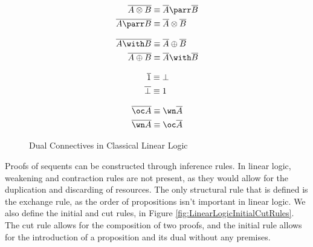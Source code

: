 \begin{figure}[H]
    \begin{minipage}{0.225\textwidth}
        \begin{align*}
            \dual{A \otimes B} & \equiv \dual{A} \parr \dual{B}   \\
            \dual{A \parr B}   & \equiv \dual{A} \otimes \dual{B}
        \end{align*}
    \end{minipage}
    \hfill
    \begin{minipage}{0.225\textwidth}
        \begin{align*}
            \dual{A \with B}  & \equiv \dual{A} \oplus \dual{B} \\
            \dual{A \oplus B} & \equiv \dual{A} \with \dual{B}
        \end{align*}
    \end{minipage}
    \hfill
    \begin{minipage}{0.225\textwidth}
        \begin{align*}
            \overline{1}    & \equiv \bot \\
            \overline{\bot} & \equiv 1
        \end{align*}
    \end{minipage}
    \hfill
    \begin{minipage}{0.225\textwidth}
        \begin{align*}
            \dual{\oc A} & \equiv \wn \dual{A} \\
            \dual{\wn A} & \equiv \oc \dual{A}
        \end{align*}
    \end{minipage}

    \caption{Dual Connectives in Classical Linear Logic}
    \label{fig:LinearLogicDual}
\end{figure}

Proofs of sequents can be constructed through inference rules. In linear logic, weakening and contraction rules are not present, as they would allow for the duplication and discarding of resources. The only structural rule that is defined is the exchange rule, as the order of propositions isn't important in linear logic. We also define the initial and cut rules, in Figure \ref{fig:LinearLogicInitialCutRules}. The cut rule allows for the composition of two proofs, and the initial rule allows for the introduction of a proposition and its dual without any premises.

